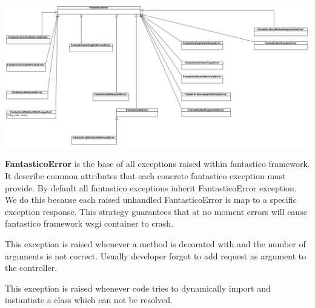 \documentclass[letterpaper,10pt,english]{sphinxmanual}
\begin{document}
\begin{fulllineitems}
\label{features/exceptions:fantastico.exceptions.FantasticoError}~
\includegraphics{exceptions.png}

\textbf{FantasticoError} is the base of all exceptions raised within fantastico framework. It describe common attributes that
each concrete fantastico exception must provide. By default all fantastico exceptions inherit FantasticoError exception.
We do this because each raised unhandled FantasticoError is map to a specific exception response. This strategy guarantees
that at no moment errors will cause fantastico framework wsgi container to crash.

\end{fulllineitems}


\begin{fulllineitems}
\label{features/exceptions:fantastico.exceptions.FantasticoControllerInvalidError}
This exception is raised whenever a method is decorated with
{\hyperref[features/mvc:fantastico.mvc.controller_decorators.Controller]{}} and the number of arguments is not correct. Usually
developer forgot to add request as argument to the controller.

\end{fulllineitems}


\begin{fulllineitems}
\label{features/exceptions:fantastico.exceptions.FantasticoClassNotFoundError}
This exception is raised whenever code tries to dynamically import and instantiate a class which can not be resolved.

\end{fulllineitems}
\end{document}
